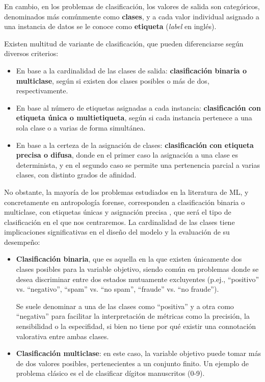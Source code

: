 En cambio, en los problemas de clasificación, los valores de salida son categóricos, denominados más comúnmente como \textbf{clases}, y a cada valor individual asignado a una instancia de datos se le conoce como \textbf{etiqueta} (\textit{label} en inglés).

Existen multitud de variante de clasificación, que pueden diferenciarse según diversos criterios:

\begin{itemize}
    \item En base a la cardinalidad de las clases de salida: \textbf{clasificación binaria o multiclase}, según si existen dos clases posibles o más de dos, respectivamente.

    \item En base al número de etiquetas asignadas a cada instancia: \textbf{clasificación con etiqueta única o multietiqueta}, según si cada instancia pertenece a una sola clase o a varias de forma simultánea.

    \item En base a la certeza de la asignación de clases: \textbf{clasificación con etiqueta precisa o difusa}, donde en el primer caso la asignación a una clase es determinista, y en el segundo caso se permite una pertenencia parcial a varias clases, con distinto grados de afinidad.
    
\end{itemize}

No obstante, la mayoría de los problemas estudiados en la literatura de \acrshort{ML}, y concretamente en antropología forense, corresponden a clasificación binaria o multiclase, con etiquetas únicas y asignación precisa \cite{bishop2006}, que será el tipo de clasificación en el que nos centraremos. La cardinalidad de las clases tiene implicaciones significativas en el diseño del modelo y la evaluación de su desempeño:

\begin{itemize}

    \item \textbf{Clasificación binaria}, que es aquella en la que existen únicamente dos clases posibles para la variable objetivo, siendo común en problemas donde se desea discriminar entre dos estados mutuamente excluyentes (p.ej., ``positivo'' vs. ``negativo'', ``spam'' vs. ``no spam'', ``fraude'' vs. ``no fraude'').
    
    Se suele denominar a una de las clases como ``positiva'' y a otra como ``negativa'' para facilitar la interpretación de métricas como la precisión, la sensibilidad o la especifidad, si bien no tiene por qué existir una connotación valorativa entre ambas clases.
    
    \item \textbf{Clasificación multiclase}: en este caso, la variable objetivo puede tomar más de dos valores posibles, pertenecientes a un conjunto finito. Un ejemplo de problema clásico es el de clasificar dígitos manuscritos (0-9).

\end{itemize}

